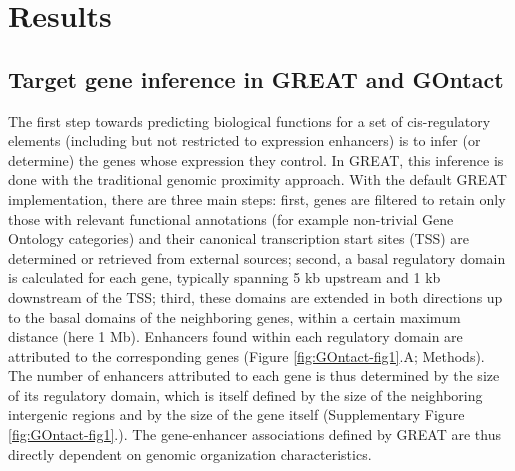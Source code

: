 \section{Results}
\subsection{Target gene inference in GREAT and GOntact}

The first step towards predicting biological functions for a set of \acrshort{cis}-regulatory elements (including but not restricted to expression enhancers) is to infer (or determine) the genes whose expression they control. In GREAT, this inference is done with the traditional genomic proximity approach. With the default GREAT implementation, there are three main steps: first, genes are filtered to retain only those with relevant functional annotations (for example non-trivial Gene Ontology categories) and their canonical transcription start sites (TSS) are determined or retrieved from external sources; second, a basal regulatory domain is calculated for each gene, typically spanning 5 kb upstream and 1 kb downstream of the TSS; third, these domains are extended in both directions up to the basal  domains of the neighboring genes, within a certain maximum distance (here 1 Mb). Enhancers found within each regulatory domain are attributed to the corresponding genes (Figure \ref{fig:GOntact-fig1}.A; Methods). The number of enhancers attributed to each gene is thus determined by the size of its regulatory domain, which is itself defined by the size of the neighboring intergenic regions and by the size of the gene itself (Supplementary Figure \ref{fig:GOntact-fig1}.). The gene-enhancer associations defined by GREAT are thus directly dependent on genomic organization characteristics. \\

